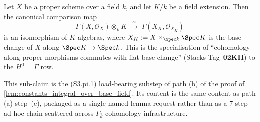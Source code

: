 \begin{lemma}

  \label{lem:S3_pi_1_Gamma_baseChange_iso_tensor_of_proper}
  Let \(X\) be a proper scheme over a field \(k\), and let \(K / k\) be a field extension. Then the canonical comparison map
  \[
    \Gamma(X, \mathcal O_X) \otimes_k K \;\xrightarrow{\;\sim\;}\; \Gamma(X_K, \mathcal O_{X_K})
  \]
  is an isomorphism of \(K\)-algebras, where \(X_K := X \times_{\Spec k} \Spec K\) is the base change of \(X\) along \(\Spec K \to \Spec k\). This is the specialisation of ``cohomology along proper morphisms commutes with flat base change'' (Stacks Tag~\textbf{02KH}) to the \(H^0 = \Gamma\) row.

  This sub-claim is the (S3.pi.1) load-bearing substep of path (b) of the proof of \cref{lem:constants_integral_over_base_field}. Its content is the same content as path (a) step~(e), packaged as a single named lemma request rather than as a 7-step ad-hoc chain scattered across \(\Gamma_{\bar k}\)-cohomology infrastructure.

\end{lemma}

